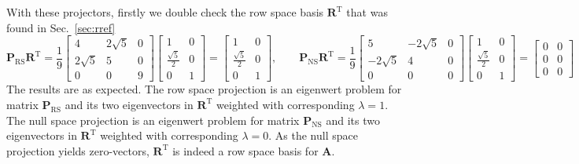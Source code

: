 \documentclass[a4paper, 11pt]{scrartcl}
\begin{document}
With these projectors, firstly we double check the row space basis $\bm{R}^\mathrm{T}$ that was found in Sec.~\ref{sec:rref}
$$
\bm{P}_\text{RS} \bm{R}^\mathrm{T}
=
\frac{1}{9}
\begin{bmatrix}
4 & 2 \sqrt{5} & 0\\
2 \sqrt{5} & 5 & 0\\
0 & 0 & 9
\end{bmatrix}
\begin{bmatrix}
1 & 0\\
\frac{\sqrt{5}}{2} & 0\\
0 & 1
\end{bmatrix}
=
\begin{bmatrix}
1 & 0\\
\frac{\sqrt{5}}{2} & 0\\
0 & 1
\end{bmatrix},\qquad
%
\bm{P}_\text{NS} \bm{R}^\mathrm{T}
=
\frac{1}{9}
\begin{bmatrix}
5 & -2 \sqrt{5} & 0\\
-2 \sqrt{5} & 4 & 0\\
0 & 0 & 0
\end{bmatrix}
\begin{bmatrix}
1 & 0\\
\frac{\sqrt{5}}{2} & 0\\
0 & 1
\end{bmatrix}
=
\begin{bmatrix}
0 & 0\\
0 & 0\\
0 & 0
\end{bmatrix}
$$
The results are as expected.
%
The row space projection is an eigenwert problem for matrix $\bm{P}_\text{RS}$
and its two eigenvectors in $\bm{R}^\mathrm{T}$ weighted with corresponding $\lambda=1$.
%
The null space projection is an eigenwert problem for matrix $\bm{P}_\text{NS}$
and its two eigenvectors in $\bm{R}^\mathrm{T}$ weighted with corresponding $\lambda=0$.
%
As the null space projection yields zero-vectors, $\bm{R}^\mathrm{T}$ is indeed a row space basis for $\bm{A}$.
\end{document}

